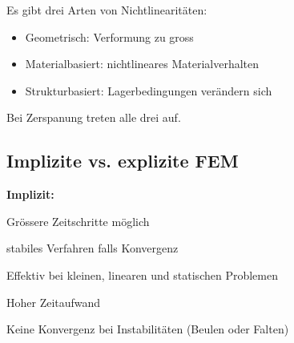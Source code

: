 Es gibt drei Arten von Nichtlinearitäten:
\begin{itemize}
    \item Geometrisch: Verformung zu gross
    \item Materialbasiert: nichtlineares Materialverhalten
    \item Strukturbasiert: Lagerbedingungen verändern sich
\end{itemize}
Bei Zerspanung treten alle drei auf.

\subsection{Implizite vs. explizite FEM}

\textbf{Implizit:} \\
\begin{minipage}{0.45\linewidth}
    \begin{plusitemize}
        \item Grössere Zeitschritte möglich 
        \item stabiles Verfahren falls Konvergenz
        \item Effektiv bei kleinen, linearen und statischen Problemen
    \end{plusitemize}
\end{minipage}
\begin{minipage}{0.5\linewidth}
    \begin{minusitemize}
        \item Hoher Zeitaufwand 
        \item Keine Konvergenz bei Instabilitäten (Beulen oder Falten)
    \end{minusitemize}
\end{minipage}
\\

